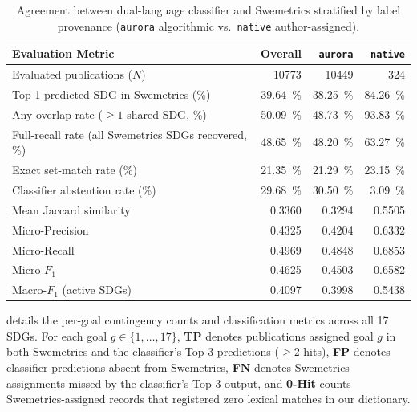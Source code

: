 \begin{table}[htbp]
  \centering
  \caption{Agreement between dual-language classifier and Swemetrics stratified by label provenance (\texttt{aurora} algorithmic vs.\ \texttt{native} author-assigned).}
  \label{tab:swemetrics_by_sourcePostRefinement}
  \begin{tabular}{lrrr}
    \toprule
    \textbf{Evaluation Metric} & \textbf{Overall} & \textbf{\texttt{aurora}} & \textbf{\texttt{native}} \\
    \midrule
    Evaluated publications ($N$) & \num{10773} & \num{10449} & \num{324} \\
    Top-1 predicted \gls{SDG} in Swemetrics (\unit{\percent}) & \qty{39.64}{\percent} & \qty{38.25}{\percent} & \qty{84.26}{\percent} \\
    Any-overlap rate ($\ge 1$ shared \gls{SDG}, \unit{\percent}) & \qty{50.09}{\percent} & \qty{48.73}{\percent} & \qty{93.83}{\percent} \\
    Full-recall rate (all Swemetrics \glspl{SDG} recovered, \unit{\percent}) & \qty{48.65}{\percent} & \qty{48.20}{\percent} & \qty{63.27}{\percent} \\
    Exact set-match rate (\unit{\percent}) & \qty{21.35}{\percent} & \qty{21.29}{\percent} & \qty{23.15}{\percent} \\
    Classifier abstention rate (\unit{\percent}) & \qty{29.68}{\percent} & \qty{30.50}{\percent} & \qty{3.09}{\percent} \\
    Mean Jaccard similarity & \num{0.3360} & \num{0.3294} & \num{0.5505} \\
    Micro-Precision & \num{0.4325} & \num{0.4204} & \num{0.6332} \\
    Micro-Recall & \num{0.4969} & \num{0.4848} & \num{0.6853} \\
    Micro-$F_1$ & \num{0.4625} & \num{0.4503} & \num{0.6582} \\
    Macro-$F_1$ (active \glspl{SDG}) & \num{0.4097} & \num{0.3998} & \num{0.5438} \\
    \bottomrule
  \end{tabular}
\end{table}

 details the per-goal contingency counts and classification metrics across all \num{17} \glspl{SDG}. For each goal $g \in \{1, \dots, 17\}$, \textbf{TP} denotes publications assigned goal $g$ in both Swemetrics and the classifier's Top-3 predictions ($\ge 2$ hits), \textbf{FP} denotes classifier predictions absent from Swemetrics, \textbf{FN} denotes Swemetrics assignments missed by the classifier's Top-3 output, and \textbf{0-Hit} counts Swemetrics-assigned records that registered zero lexical matches in our dictionary.

